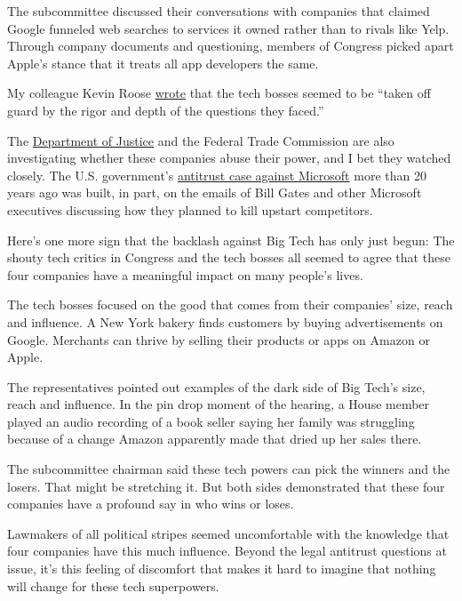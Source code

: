 The subcommittee discussed their conversations with companies that
claimed Google funneled web searches to services it owned rather than to
rivals like Yelp. Through company documents and questioning, members of
Congress picked apart Apple's stance that it treats all app developers
the same.

My colleague Kevin Roose
\href{https://www.nytimes.com/2020/07/30/technology/big-tech-ceos.html}{wrote}
that the tech bosses seemed to be ``taken off guard by the rigor and
depth of the questions they faced.''

The
\href{https://www.nytimes.com/2020/06/25/technology/barr-google-investigation.html}{Department
of Justice} and the Federal Trade Commission are also investigating
whether these companies abuse their power, and I bet they watched
closely. The U.S. government's
\href{https://www.nytimes.com/live/2020/07/29/technology/tech-ceos-hearing-testimony/todays-hearing-has-echoes-of-bill-gates-22-years-ago}{antitrust
case against Microsoft} more than 20 years ago was built, in part, on
the emails of Bill Gates and other Microsoft executives discussing how
they planned to kill upstart competitors.

Here's one more sign that the backlash against Big Tech has only just
begun: The shouty tech critics in Congress and the tech bosses all
seemed to agree that these four companies have a meaningful impact on
many people's lives.

The tech bosses focused on the good that comes from their companies'
size, reach and influence. A New York bakery finds customers by buying
advertisements on Google. Merchants can thrive by selling their products
or apps on Amazon or Apple.

The representatives pointed out examples of the dark side of Big Tech's
size, reach and influence. In the pin drop moment of the hearing, a
House member played an audio recording of a book seller saying her
family was struggling because of a change Amazon apparently made that
dried up her sales there.

The subcommittee chairman said these tech powers can pick the winners
and the losers. That might be stretching it. But both sides demonstrated
that these four companies have a profound say in who wins or loses.

Lawmakers of all political stripes seemed uncomfortable with the
knowledge that four companies have this much influence. Beyond the legal
antitrust questions at issue, it's this feeling of discomfort that makes
it hard to imagine that nothing will change for these tech superpowers.

